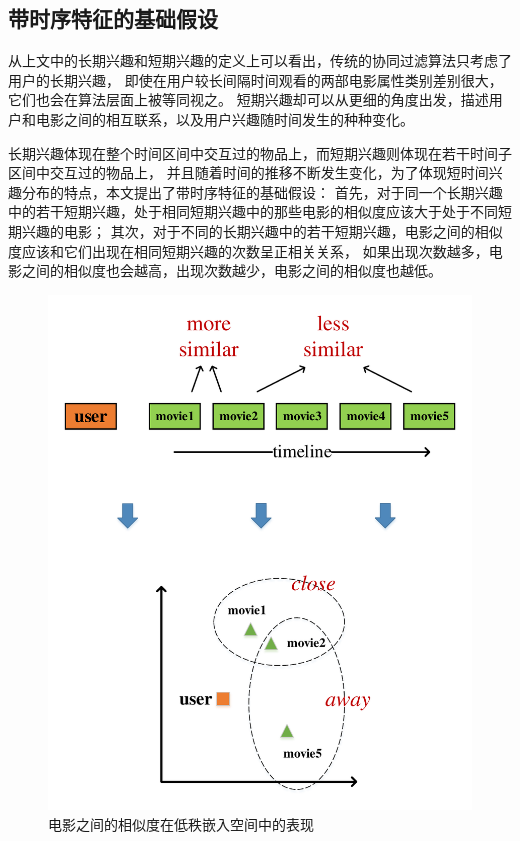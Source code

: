 \subsection{带时序特征的基础假设}
从上文中的长期兴趣和短期兴趣的定义上可以看出，传统的协同过滤算法只考虑了用户的长期兴趣，
即使在用户较长间隔时间观看的两部电影属性类别差别很大，它们也会在算法层面上被等同视之。
短期兴趣却可以从更细的角度出发，描述用户和电影之间的相互联系，以及用户兴趣随时间发生的种种变化。

长期兴趣体现在整个时间区间中交互过的物品上，而短期兴趣则体现在若干时间子区间中交互过的物品上，
并且随着时间的推移不断发生变化，为了体现短时间兴趣分布的特点，本文提出了带时序特征的基础假设：
首先，对于同一个长期兴趣中的若干短期兴趣，处于相同短期兴趣中的那些电影的相似度应该大于处于不同短期兴趣的电影；
其次，对于不同的长期兴趣中的若干短期兴趣，电影之间的相似度应该和它们出现在相同短期兴趣的次数呈正相关关系，
如果出现次数越多，电影之间的相似度也会越高，出现次数越少，电影之间的相似度也越低。

\begin{figure}[htbp]
\centering
\includegraphics[scale=0.5]{images/embedding.pdf}
\caption{电影之间的相似度在低秩嵌入空间中的表现}
\label{fig:embedding}
\end{figure}

